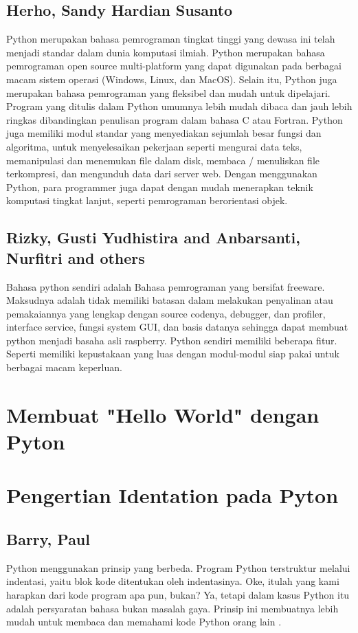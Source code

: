 \documentclass[12pt]{article}
\begin{document}
\subsection{Herho, Sandy Hardian Susanto}
Python merupakan bahasa pemrograman tingkat tinggi yang dewasa ini telah menjadi standar dalam dunia komputasi ilmiah. Python merupakan bahasa pemrograman open source multi-platform yang dapat digunakan pada berbagai macam sistem operasi (Windows, Linux, dan MacOS). Selain itu, Python juga merupakan bahasa pemrograman yang fleksibel dan mudah untuk dipelajari. Program yang ditulis dalam Python umumnya lebih mudah dibaca dan jauh lebih ringkas dibandingkan penulisan program dalam bahasa C atau Fortran. Python juga memiliki modul standar yang menyediakan sejumlah besar fungsi dan algoritma, untuk menyelesaikan pekerjaan seperti mengurai data teks, memanipulasi dan menemukan file dalam disk, membaca / menuliskan file terkompresi, dan mengunduh data dari server web. Dengan menggunakan Python, para programmer juga dapat dengan mudah menerapkan teknik komputasi tingkat lanjut, seperti pemrograman berorientasi objek\cite{herho2018tutorial}.

\subsection{Rizky, Gusti Yudhistira and Anbarsanti, Nurfitri and others}
Bahasa python sendiri adalah Bahasa pemrograman yang bersifat freeware. Maksudnya adalah tidak memiliki batasan dalam melakukan penyalinan atau pemakaiannya yang lengkap dengan source codenya, debugger, dan profiler, interface service, fungsi system GUI, dan basis datanya sehingga dapat membuat python menjadi basaha asli raspberry. Python sendiri memiliki beberapa fitur. Seperti memiliki kepustakaan yang luas dengan modul-modul siap pakai untuk berbagai macam keperluan\cite{rizky2016desain}. 

\section{Membuat "Hello World" dengan Pyton}


\section{Pengertian Identation pada Pyton}

\subsection{Barry, Paul}
Python menggunakan prinsip yang berbeda. Program Python terstruktur melalui indentasi, yaitu blok kode ditentukan oleh indentasinya. Oke, itulah yang kami harapkan dari kode program apa pun, bukan? Ya, tetapi dalam kasus Python itu adalah persyaratan bahasa bukan masalah gaya. Prinsip ini membuatnya lebih mudah untuk membaca dan memahami kode Python orang lain \cite{barry2016head}.
\end{document}
